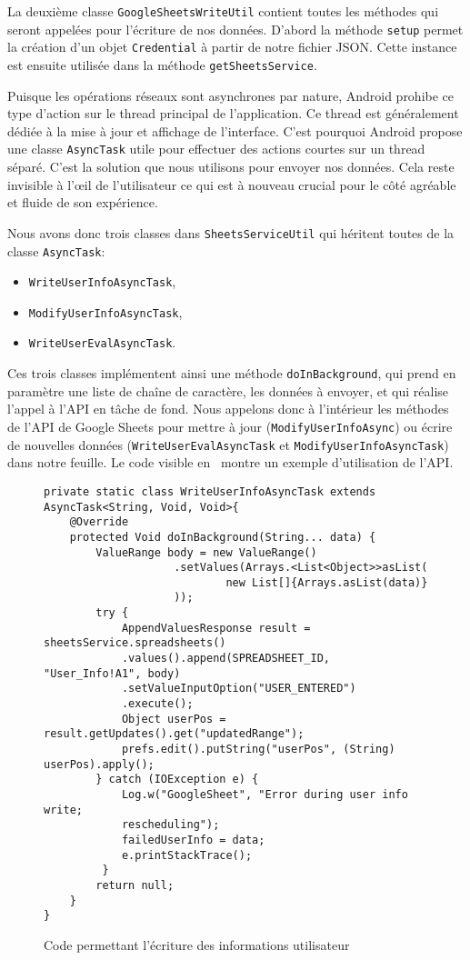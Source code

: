 \documentclass[../main.tex]{subfiles}
\begin{document}
La deuxième classe \texttt{GoogleSheetsWriteUtil} contient toutes les méthodes qui seront appelées pour l'écriture de nos données. D'abord la méthode \texttt{setup} permet la création d'un objet \texttt{Credential} à partir de notre fichier JSON. Cette instance est ensuite utilisée dans la méthode \texttt{getSheetsService}.

Puisque les opérations réseaux sont asynchrones par nature, Android prohibe ce type d'action sur le thread principal de l'application. Ce thread est généralement dédiée à la mise à jour et affichage de l'interface. C'est pourquoi Android propose une classe \texttt{AsyncTask} utile pour effectuer des actions courtes sur un thread séparé. C'est la solution que nous utilisons pour envoyer nos données. Cela reste invisible à l'œil de l'utilisateur ce qui est à nouveau crucial pour le côté agréable et fluide de son expérience.

Nous avons donc trois classes dans \texttt{SheetsServiceUtil} qui héritent toutes de la classe \texttt{AsyncTask}:
\begin{itemize}
\item \texttt{WriteUserInfoAsyncTask},
\item \texttt{ModifyUserInfoAsyncTask},
\item \texttt{WriteUserEvalAsyncTask}.
\end{itemize}
Ces trois classes implémentent ainsi une méthode \texttt{doInBackground}, qui prend en paramètre une liste de chaîne de caractère, les données à envoyer, et qui réalise l'appel à l'API en tâche de fond. Nous appelons donc à l'intérieur les méthodes de l’API de Google Sheets pour mettre à jour (\texttt{ModifyUserInfoAsync}) ou écrire de nouvelles données (\texttt{WriteUserEvalAsyncTask} et \texttt{ModifyUserInfoAsyncTask}) dans notre feuille. Le code visible en~ montre un exemple d'utilisation de l'API.\\
\begin{figure}[ht!]
\begin{lstlisting}[tabsize=3]
private static class WriteUserInfoAsyncTask extends 
AsyncTask<String, Void, Void>{
	@Override
	protected Void doInBackground(String... data) {
		ValueRange body = new ValueRange()
                    .setValues(Arrays.<List<Object>>asList(
                            new List[]{Arrays.asList(data)}
                    ));
		try {
			AppendValuesResponse result = sheetsService.spreadsheets()
			.values().append(SPREADSHEET_ID, "User_Info!A1", body)
			.setValueInputOption("USER_ENTERED")
			.execute();
			Object userPos = result.getUpdates().get("updatedRange");
			prefs.edit().putString("userPos", (String) userPos).apply();
		} catch (IOException e) {
			Log.w("GoogleSheet", "Error during user info write; 
			rescheduling");
			failedUserInfo = data;
			e.printStackTrace();
		 }
		return null;
	}
}
\end{lstlisting}
\caption{Code permettant l'écriture des informations utilisateur}
\label{fig-writeuser}
\end{figure}
\end{document}
